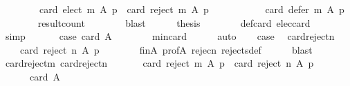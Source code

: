 \begin{isabellebody}
\ \ \ \ \ \ \ \ card\ {\isacharparenleft}{\kern0pt}elect\ m\ A\ p{\isacharparenright}{\kern0pt}\ {\isacharplus}{\kern0pt}\ card\ {\isacharparenleft}{\kern0pt}reject\ m\ A\ p{\isacharparenright}{\kern0pt}\ {\isacharplus}{\kern0pt}\isanewline
\ \ \ \ \ \ \ \ \ \ card\ {\isacharparenleft}{\kern0pt}defer\ m\ A\ p{\isacharparenright}{\kern0pt}{\isachardoublequoteclose}\isanewline
\ \ \ \ \ \ \isamarkupfalse%
\ result{\isacharunderscore}{\kern0pt}count\isanewline
\ \ \ \ \ \ \isamarkupfalse%
\ blast\isanewline
\ \ \ \ \isamarkupfalse%
\ {\isacharquery}{\kern0pt}thesis\isanewline
\ \ \ \ \ \ \isamarkupfalse%
\ def{\isacharunderscore}{\kern0pt}card{\isacharunderscore}{\kern0pt}{}\ elec{\isacharunderscore}{\kern0pt}card{\isacharunderscore}{\kern0pt}{}\isanewline
\ \ \ \ \ \ \isamarkupfalse%
\ simp\isanewline
\ \ \isamarkupfalse%
\isanewline
\ \ \isamarkupfalse%
\ case{}{\isacharcolon}{\kern0pt}\ {\isachardoublequoteopen}card\ A\ {\isasymge}\ {}{\isachardoublequoteclose}\isanewline
\ \ \ \ \isamarkupfalse%
\ min{\isacharunderscore}{\kern0pt}{}{\isacharunderscore}{\kern0pt}card\isanewline
\ \ \ \ \isamarkupfalse%
\ auto\isanewline
\ \ \isamarkupfalse%
\ case{}\ \isamarkupfalse%
\ card{\isacharunderscore}{\kern0pt}reject{\isacharunderscore}{\kern0pt}n{\isacharcolon}{\kern0pt}\isanewline
\ \ \ \ {\isachardoublequoteopen}card\ {\isacharparenleft}{\kern0pt}reject\ n\ A\ p{\isacharparenright}{\kern0pt}\ {\isacharequal}{\kern0pt}\ {}{\isachardoublequoteclose}\isanewline
\ \ \ \ \isamarkupfalse%
\ fin{\isacharunderscore}{\kern0pt}A\ prof{\isacharunderscore}{\kern0pt}A\ rejec{\isacharunderscore}{\kern0pt}n{\isacharunderscore}{\kern0pt}{}\ rejects{\isacharunderscore}{\kern0pt}def\isanewline
\ \ \ \ \isamarkupfalse%
\ blast\isanewline
\ \ \isamarkupfalse%
\ card{\isacharunderscore}{\kern0pt}reject{\isacharunderscore}{\kern0pt}m\ card{\isacharunderscore}{\kern0pt}reject{\isacharunderscore}{\kern0pt}n\isanewline
\ \ \isamarkupfalse%
\isanewline
\ \ \ \ {\isachardoublequoteopen}card\ {\isacharparenleft}{\kern0pt}reject\ m\ A\ p{\isacharparenright}{\kern0pt}\ {\isacharplus}{\kern0pt}\ card\ {\isacharparenleft}{\kern0pt}reject\ n\ A\ p{\isacharparenright}{\kern0pt}\ {\isacharequal}{\kern0pt}\isanewline
\ \ \ \ \ \ card\ A\ {\isacharplus}{\kern0pt}\ {}{\isachardoublequoteclose}\isanewline

\end{isabellebody}
